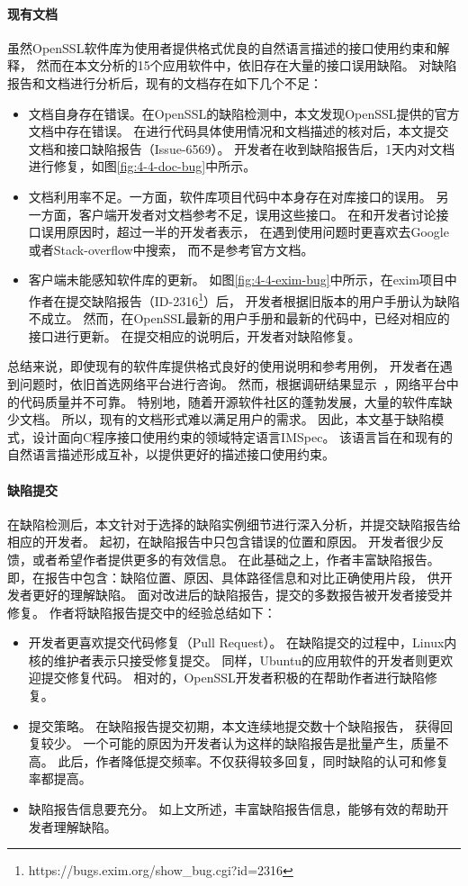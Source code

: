 \paragraph{现有文档}
虽然OpenSSL软件库为使用者提供格式优良的自然语言描述的接口使用约束和解释，
然而在本文分析的15个应用软件中，依旧存在大量的接口误用缺陷。
对缺陷报告和文档进行分析后，现有的文档存在如下几个不足：
\begin{itemize}
	\item 文档自身存在错误。在OpenSSL的缺陷检测中，本文发现OpenSSL提供的官方文档中存在错误。
	在进行代码具体使用情况和文档描述的核对后，本文提交文档和接口缺陷报告（Issue-6569）。
	开发者在收到缺陷报告后，1天内对文档进行修复，如图\ref{fig:4-4-doc-bug}中所示。
	\item 文档利用率不足。一方面，软件库项目代码中本身存在对库接口的误用。
	另一方面，客户端开发者对文档参考不足，误用这些接口。
	在和开发者讨论接口误用原因时，超过一半的开发者表示，
	在遇到使用问题时更喜欢去Google或者Stack-overflow中搜索，
	而不是参考官方文档。
	\item 客户端未能感知软件库的更新。
	如图\ref{fig:4-4-exim-bug}中所示，在exim项目中作者在提交缺陷报告（ID-2316\footnote{https://bugs.exim.org/show\_bug.cgi?id=2316}）后，
	开发者根据旧版本的用户手册认为缺陷不成立。
	然而，在OpenSSL最新的用户手册和最新的代码中，已经对相应的接口进行更新。
	在提交相应的说明后，开发者对缺陷修复。
\end{itemize}

总结来说，即使现有的软件库提供格式良好的使用说明和参考用例，
开发者在遇到问题时，依旧首选网络平台进行咨询。
然而，根据调研结果显示~\cite{18-icse-stack}，网络平台中的代码质量并不可靠。
特别地，随着开源软件社区的蓬勃发展，大量的软件库缺少文档。
所以，现有的文档形式难以满足用户的需求。
因此，本文基于缺陷模式，设计面向C程序接口使用约束的领域特定语言IMSpec。
该语言旨在和现有的自然语言描述形成互补，以提供更好的描述接口使用约束。



\paragraph{缺陷提交}
在缺陷检测后，本文针对于选择的缺陷实例细节进行深入分析，并提交缺陷报告给相应的开发者。
起初，在缺陷报告中只包含错误的位置和原因。
开发者很少反馈，或者希望作者提供更多的有效信息。
在此基础之上，作者丰富缺陷报告。
即，在报告中包含：缺陷位置、原因、具体路径信息和对比正确使用片段，
供开发者更好的理解缺陷。
面对改进后的缺陷报告，提交的多数报告被开发者接受并修复。
作者将缺陷报告提交中的经验总结如下：
\begin{itemize}
	\item 开发者更喜欢提交代码修复（Pull Request）。
	在缺陷提交的过程中，Linux内核的维护者表示只接受修复提交。
	同样，Ubuntu的应用软件的开发者则更欢迎提交修复代码。
	相对的，OpenSSL开发者积极的在帮助作者进行缺陷修复。
	\item 提交策略。
	在缺陷报告提交初期，本文连续地提交数十个缺陷报告，
	获得回复较少。
	一个可能的原因为开发者认为这样的缺陷报告是批量产生，质量不高。
	此后，作者降低提交频率。不仅获得较多回复，同时缺陷的认可和修复率都提高。
	\item 缺陷报告信息要充分。
	如上文所述，丰富缺陷报告信息，能够有效的帮助开发者理解缺陷。
\end{itemize}

